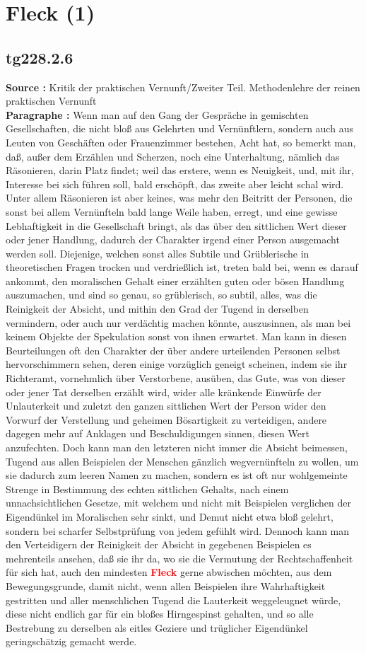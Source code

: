 \documentclass[a4paper,12pt,twoside]{book}
\newcommand{\match}[1]{\textcolor{red}{\textbf{#1}}}
\newcommand{\unnumberedsection}[1]{
	\section*{#1}
	\addcontentsline{toc}{section}{#1}
	\markright{#1}
}
\begin{document}
	\unnumberedsection{Fleck (1)} 
	\subsection*{tg228.2.6} 
	\textbf{Source : }Kritik der praktischen Vernunft/Zweiter Teil. Methodenlehre der reinen praktischen Vernunft\\  
	
	\textbf{Paragraphe : }Wenn man auf den Gang der Gespräche in gemischten Gesellschaften, die nicht bloß aus Gelehrten und Vernünftlern, sondern auch aus Leuten von Geschäften oder Frauenzimmer bestehen, Acht hat, so bemerkt man, daß, außer dem Erzählen und Scherzen, noch eine Unterhaltung, nämlich das Räsonieren, darin Platz findet; weil das erstere, wenn es Neuigkeit, und, mit ihr, Interesse bei sich führen soll, bald erschöpft, das zweite aber leicht schal wird. Unter allem Räsonieren ist aber keines, was mehr den Beitritt der Personen, die sonst bei allem Vernünfteln bald lange Weile haben, erregt, und eine gewisse Lebhaftigkeit in die Gesellschaft bringt, als das über den sittlichen Wert dieser oder jener Handlung, dadurch der Charakter irgend einer Person ausgemacht werden soll. Diejenige, welchen sonst alles Subtile und Grüblerische in theoretischen Fragen trocken und verdrießlich ist, treten bald bei, wenn es darauf ankommt, den moralischen Gehalt einer erzählten guten oder bösen Handlung auszumachen, und sind so genau, so grüblerisch, so subtil, alles, was die Reinigkeit der Absicht, und mithin  den Grad der Tugend in derselben vermindern, oder auch nur verdächtig machen könnte, auszusinnen, als man bei keinem Objekte der Spekulation sonst von ihnen erwartet. Man kann in diesen Beurteilungen oft den Charakter der über andere urteilenden Personen selbst hervorschimmern sehen, deren einige vorzüglich geneigt scheinen, indem sie ihr Richteramt, vornehmlich über Verstorbene, ausüben, das Gute, was von dieser oder jener Tat derselben erzählt wird, wider alle kränkende Einwürfe der Unlauterkeit und zuletzt den ganzen sittlichen Wert der Person wider den Vorwurf der Verstellung und geheimen Bösartigkeit zu verteidigen, andere dagegen mehr auf Anklagen und Beschuldigungen sinnen, diesen Wert anzufechten. Doch kann man den letzteren nicht immer die Absicht beimessen, Tugend aus allen Beispielen der Menschen gänzlich wegvernünfteln zu wollen, um sie dadurch zum leeren Namen zu machen, sondern es ist oft nur wohlgemeinte Strenge in Bestimmung des echten sittlichen Gehalts, nach einem unnachsichtlichen Gesetze, mit welchem und nicht mit Beispielen verglichen der Eigendünkel im Moralischen sehr sinkt, und Demut nicht etwa bloß gelehrt, sondern bei scharfer Selbstprüfung von jedem gefühlt wird. Dennoch kann man den Verteidigern der Reinigkeit der Absicht in gegebenen Beispielen es mehrenteils ansehen, daß sie ihr da, wo sie die Vermutung der Rechtschaffenheit für sich hat, auch den mindesten \match{Fleck} gerne abwischen möchten, aus dem Bewegungsgrunde, damit nicht, wenn allen Beispielen ihre Wahrhaftigkeit gestritten und aller menschlichen Tugend die Lauterkeit weggeleugnet würde, diese nicht endlich gar für ein bloßes Hirngespinst gehalten, und so alle Bestrebung zu derselben als eitles Geziere und trüglicher Eigendünkel geringschätzig gemacht werde. 
	
\end{document}
